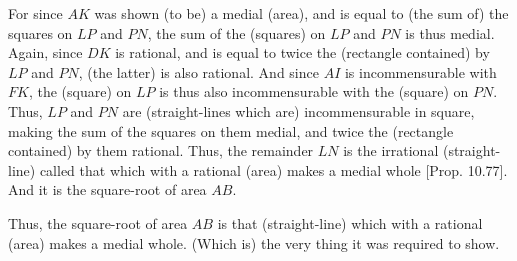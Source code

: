 \begin{Parallel}{}{}
{For since $AK$ was shown (to be) a medial (area), and is equal to (the sum of) the squares on $LP$ and $PN$, the sum of the (squares) on $LP$
and $PN$ is thus medial. Again, since $DK$ is rational, and
is equal to twice the (rectangle contained) by $LP$ and $PN$,  (the latter) is also
rational. And since $AI$ is incommensurable with $FK$, the (square) on
$LP$ is thus also incommensurable with the (square) on $PN$. Thus,
$LP$ and $PN$ are (straight-lines which are) incommensurable in square, making the
sum of the squares on them medial, and twice the (rectangle contained) by
them rational. Thus, the remainder $LN$ is the irrational (straight-line)
called that which with a rational (area) makes a medial whole [Prop. 10.77].
And it is the square-root of area $AB$.

Thus, the square-root of area $AB$ is that (straight-line) which with a rational (area) makes a medial whole. (Which is) the very thing it was required to show.}
\end{Parallel}

